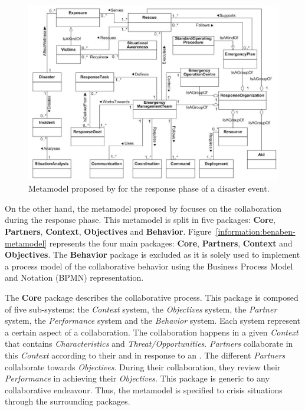 \begin{figure}[htb]
    \centering
    \includegraphics[width=\textwidth]{figures/chap-3/othman-metamodel-response.PNG}
    \caption{Metamodel proposed by \textcite[Fig.4]{othmanDevelopmentValidationDisaster2014} for the response phase of a disaster event.}
    \label{information:othman-metamodel}
\end{figure}

On the other hand, the metamodel proposed by \textcite{benabenMetamodelKnowledgeManagement2016} focuses on the collaboration during the response phase.
This metamodel is split in five packages: \textbf{Core}, \textbf{Partners}, \textbf{Context}, \textbf{Objectives} and \textbf{Behavior}.
Figure~\ref{information:benaben-metamodel} represents the four main packages: \textbf{Core}, \textbf{Partners}, \textbf{Context} and \textbf{Objectives}.
The \textbf{Behavior} package is excluded as it is solely used to implement a process model of the collaborative behavior using the Business Process Model and Notation (BPMN) representation.

The \textbf{Core} package describes the collaborative process.
This package is composed of five sub-systems: the \textit{Context} system, the \textit{Objectives} system, the \textit{Partner} system, the \textit{Performance} system and the \textit{Behavior} system.
Each system represent a certain aspect of a collaboration.
The collaboration happens in a given \textit{Context} that contains \textit{Characteristics} and \textit{Threat/Opportunities}.
\textit{Partners} collaborate in this \textit{Context} according to their  and  in response to an .
The different \textit{Partners} collaborate towards \textit{Objectives}.
During their collaboration, they review their \textit{Performance} in achieving their \textit{Objectives}.
This package is generic to any collaborative endeavour.
Thus, the metamodel is specified to crisis situations through the surrounding packages.

